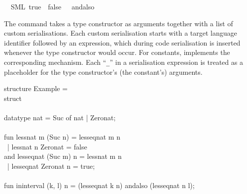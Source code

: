 \begin{isabellebody}
\ \ {\isacharparenleft}SML\ {\isachardoublequoteopen}true{\isachardoublequoteclose}\ \ {\isachardoublequoteopen}false{\isachardoublequoteclose}\ \ {\isachardoublequoteopen}{\isacharunderscore}\ andalso\ {\isacharunderscore}{\isachardoublequoteclose}{\isacharparenright}%
\endisatagquotett
{\isafoldquotett}%
%
\isadelimquotett
%
\endisadelimquotett
%
\begin{isamarkuptext}%
\noindent The \hyperlink{command.code-type}{\mbox{}} command takes a type constructor
  as arguments together with a list of custom serialisations.
  Each custom serialisation starts with a target language
  identifier followed by an expression, which during
  code serialisation is inserted whenever the type constructor
  would occur.  For constants, \hyperlink{command.code-const}{\mbox{}} implements
  the corresponding mechanism.  Each ``\verb|_|'' in
  a serialisation expression is treated as a placeholder
  for the type constructor's (the constant's) arguments.%
\end{isamarkuptext}%
\isamarkuptrue%
%
\isadelimquote
%
\endisadelimquote
%
\isatagquote
%
\begin{isamarkuptext}%
\isaverbatim%
\noindent%
\hspace*{0pt}structure Example = \\
\hspace*{0pt}struct\\
\hspace*{0pt}\\
\hspace*{0pt}datatype nat = Suc of nat | Zero{}nat;\\
\hspace*{0pt}\\
\hspace*{0pt}fun less{}nat m (Suc n) = less{}eq{}nat m n\\
\hspace*{0pt} ~| less{}nat n Zero{}nat = false\\
\hspace*{0pt}and less{}eq{}nat (Suc m) n = less{}nat m n\\
\hspace*{0pt} ~| less{}eq{}nat Zero{}nat n = true;\\
\hspace*{0pt}\\
\hspace*{0pt}fun in{}interval (k, l) n = (less{}eq{}nat k n) andalso (less{}eq{}nat n l);\\

\end{isamarkuptext}
\end{isabellebody}
